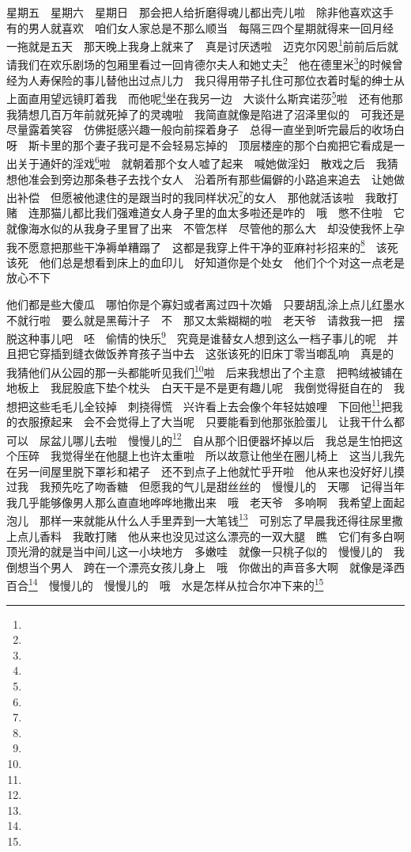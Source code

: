 \par 星期五　星期六　星期日　那会把人给折磨得魂儿都出壳儿啦　除非他喜欢这手　有的男人就喜欢　咱们女人家总是不那么顺当　每隔三四个星期就得来一回月经　一拖就是五天　那天晚上我身上就来了　真是讨厌透啦　迈克尔冈恩\footnote{}前前后后就请我们在欢乐剧场的包厢里看过一回肯德尔夫人和她丈夫\footnote{}　他在德里米\footnote{}的时候曾经为人寿保险的事儿替他出过点儿力　我只得用带子扎住可那位衣着时髦的绅士从上面直用望远镜盯着我　而他呢\footnote{}坐在我另一边　大谈什么斯宾诺莎\footnote{}啦　还有他那我猜想几百万年前就死掉了的灵魂啦　我简直就像是陷进了沼泽里似的　可我还是尽量露着笑容　仿佛挺感兴趣一般向前探着身子　总得一直坐到听完最后的收场白呀　斯卡里的那个妻子我可是不会轻易忘掉的　顶层楼座的那个白痴把它看成是一出关于通奸的淫戏\footnote{}啦　就朝着那个女人嘘了起来　喊她做淫妇　散戏之后　我猜想他准会到旁边那条巷子去找个女人　沿着所有那些偏僻的小路追来追去　让她做出补偿　但愿被他逮住的是跟当时的我同样状况\footnote{}的女人　那他就活该啦　我敢打赌　连那猫儿都比我们强难道女人身子里的血太多啦还是咋的　哦　憋不住啦　它就像海水似的从我身子里冒了出来　不管怎样　尽管他的那么大　却没使我怀上孕　我不愿意把那些干净褥单糟蹋了　这都是我穿上件干净的亚麻衬衫招来的\footnote{}　该死　该死　他们总是想看到床上的血印儿　好知道你是个处女　他们个个对这一点老是放心不下　
\par 他们都是些大傻瓜　哪怕你是个寡妇或者离过四十次婚　只要胡乱涂上点儿红墨水不就行啦　要么就是黑莓汁子　不　那又太紫糊糊的啦　老天爷　请救我一把　摆脱这种事儿吧　呸　偷情的快乐\footnote{}　究竟是谁替女人想到这么一档子事儿的呢　并且把它穿插到缝衣做饭养育孩子当中去　这张该死的旧床丁零当啷乱响　真是的　我猜他们从公园的那一头都能听见我们\footnote{}啦　后来我想出了个主意　把鸭绒被铺在地板上　我屁股底下垫个枕头　白天干是不是更有趣儿呢　我倒觉得挺自在的　我想把这些毛毛儿全铰掉　刺挠得慌　兴许看上去会像个年轻姑娘哩　下回他\footnote{}把我的衣服撩起来　会不会觉得上了大当呢　只要能看到他那张脸蛋儿　让我干什么都可以　尿盆儿哪儿去啦　慢慢儿的\footnote{}　自从那个旧便器坏掉以后　我总是生怕把这个压碎　我觉得坐在他腿上也许太重啦　所以故意让他坐在圈儿椅上　这当儿我先在另一间屋里脱下罩衫和裙子　还不到点子上他就忙乎开啦　他从来也没好好儿摸过我　我预先吃了吻香糖　但愿我的气儿是甜丝丝的　慢慢儿的　天哪　记得当年我几乎能够像男人那么直直地哗哗地撒出来　哦　老天爷　多响啊　我希望上面起泡儿　那样一来就能从什么人手里弄到一大笔钱\footnote{}　可别忘了早晨我还得往尿里撒上点儿香料　我敢打赌　他从来也没见过这么漂亮的一双大腿　瞧　它们有多白啊　顶光滑的就是当中间儿这一小块地方　多嫩哇　就像一只桃子似的　慢慢儿的　我倒想当个男人　跨在一个漂亮女孩儿身上　哦　你做出的声音多大啊　就像是泽西百合\footnote{}　慢慢儿的　慢慢儿的　哦　水是怎样从拉合尔冲下来的\footnote{}　

